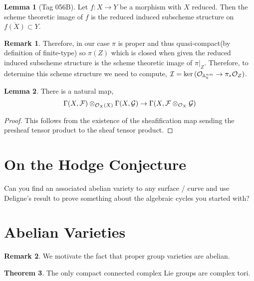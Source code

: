 \documentclass[12pt]{extarticle}
\theoremstyle{definition}
\newtheorem{theorem}{Theorem}[section]
\newtheorem{lemma}[theorem]{Lemma}
\newtheorem{remark}{Remark}
\newcommand{\F}{\mathcal{F}}
\newcommand{\G}{\mathcal{G}}
\begin{document}
\begin{lemma}[Tag 056B]
Let $f : X \to Y$ be a morphism with $X$ reduced. Then the scheme theoretic image of $f$ is the reduced induced subscheme structure on $\overline{f(X)} \subset Y$.
\end{lemma}

\begin{remark}
Therefore, in our case $\pi$ is proper and thus quasi-compact(by definition of finite-type) so $\pi(Z)$ which is closed when given the reduced induced subscheme structure is the scheme theoretic image of $\pi|_Z$. Therefore, to determine this scheme structure we need to compute, $\mathcal{I} = \ker{(\mathcal{O}_{\mathbb{A}^{nm}_k} \to \pi_* \mathcal{O}_{Z})}$.  
\end{remark}

\begin{lemma}
There is a natural map,
\[ \Gamma(X, \F) \otimes_{\struct{X}(X)} \Gamma(X, \G) \to \Gamma(X, \F \otimes_{\struct{X}} \G)  \] 
\end{lemma}

\begin{proof}
This follows from the existence of the sheafification map sending the presheaf tensor product to the sheaf tensor product.
\end{proof}

\section{On the Hodge Conjecture}

Can you find an associated abelian variety to any surface / curve and use Deligne's result to prove something about the algebraic cycles you started with?


\section{Abelian Varieties}

\begin{remark}
We motivate the fact that proper group varieties are abelian.
\end{remark}

\begin{theorem}
The only compact connected complex Lie groups are complex tori.
\end{theorem}
\end{document}
